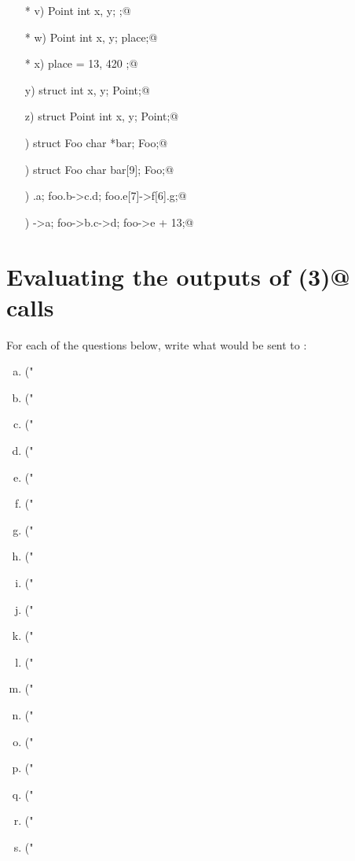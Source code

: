 \documentclass[a4paper,12pt]{article}
\begin{document}
\begin{enumerate}[a)]
\item[* v)]\lstinline@struct Point { int x, y; };@
\item[* w)]\lstinline@struct Point { int x, y; } place;@
\item[* x)] place = { 13, 420 };@
\item[y)]\lstinline@typedef struct { int x, y; } Point;@
\item[z)]\lstinline@typedef struct Point { int x, y; } Point;@
\item[\textalpha)]\lstinline@typedef struct Foo { char *bar; } Foo;@
\item[\textbeta)]\lstinline@typedef struct Foo { char bar[9]; } Foo;@
\item[\textgamma)]\lstinline@foo.a; foo.b->c.d; foo.e[7]->f[6].g;@
\item[\textdelta)]\lstinline@foo->a; foo->b.c->d; foo->e + 13;@
\end{enumerate}

\newpage

\section{Evaluating the outputs of \lstinline@printf(3)@ calls}

For each of the questions below, write what would be sent to
\lstinline@stdout@:

\begin{enumerate}[a)]
	\item\lstinline@printf("~%d~", 13);@
	\item\lstinline@printf("~%+d~", 13);@
	\item\lstinline@printf("~%5d~", 13);@
	\item\lstinline@printf("~%+5d~", 13);@
	\item\lstinline@printf("~%-5d~", 13);@
	\item\lstinline@printf("~%+-5d~", 13);@
	\item\lstinline@printf("~%05d~", 13);@
	\item\lstinline@printf("~%+05d~", 13);@
	\item\lstinline@printf("~%3.9f~", 13.0);@
	\item\lstinline@printf("~%+3.9f~", 13.0);@
	\item\lstinline@printf("~%9.3f~", 13.0);@
	\item\lstinline@printf("~%+9.3f~", 13.0);@
	\item\lstinline@printf("~%-9.3f~", 13.0);@
	\item\lstinline@printf("~%+-9.3f~", 13.0);@
	\item\lstinline@printf("~%09.3f~", 13.0);@
	\item\lstinline@printf("~%+09.3f~", 13.0);@
	\item\lstinline@printf("%s,%6s!", "Hello", "world");@
	\item\lstinline@printf("~%d~", '7' - '0');@
	\item\lstinline@printf("~%c~", 7 + '0');@
\end{enumerate}
\end{document}

